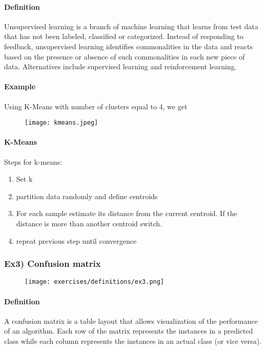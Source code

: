 \paragraph{Definition}
Unsupervised learning is a branch of machine learning that learns from test data that has not been labeled, classified or categorized. Instead of responding to feedback, unsupervised learning identifies commonalities in the data and reacts based on the presence or absence of such commonalities in each new piece of data. Alternatives include supervised learning and reinforcement learning. 

\paragraph{Example}
Using K-Means with number of clusters equal to 4, we get 

\begin{figure}[H]
    \centering
    \texttt{[image: kmeans.jpeg]}
\end{figure}

\paragraph{K-Means}
Steps for k-means:
\begin{enumerate}
\item Set k
\item partition data randomly and define centroids
\item For each sample estimate its distance from the current centroid. If the distance is more than another centroid switch.
\item repeat previous step until convergence
\end{enumerate}


\subsubsection{Ex3) Confusion matrix }


\begin{figure}[H]
    \centering
    \texttt{[image: exercises/definitions/ex3.png]}
\end{figure}

\paragraph{Definition}
A confusion matrix is a table layout that allows visualization of the performance of an algorithm.  Each row of the matrix represents the instances in a predicted class while each column represents the instances in an actual class (or vice versa).

